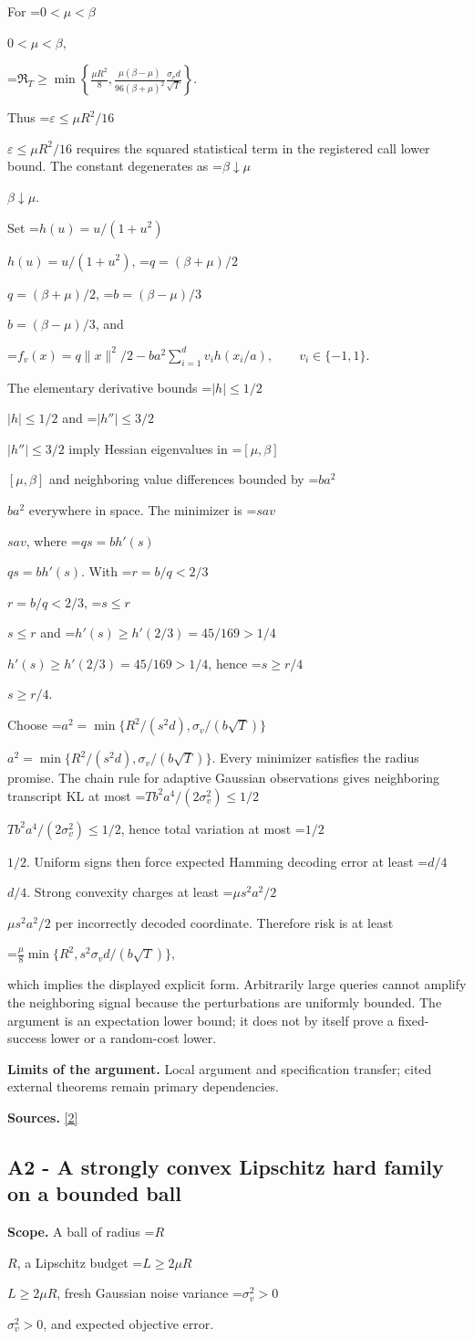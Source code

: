 \documentclass[10pt,a4paper]{article}
\newcommand{\AtlasMath}[1]{\par\begingroup\centering\setbox0=\hbox{$\displaystyle #1$}\ifdim\wd0>1.4\linewidth\typeout{ATLAS WIDE FORMULA: \the\wd0}\fi\ifdim\wd0>\linewidth\resizebox{\linewidth}{!}{\box0}\else\box0\fi\par\endgroup}
\newcommand{\AtlasInlineMath}[1]{\begingroup\setbox0=\hbox{$#1$}\ifdim\wd0>.4\linewidth\endgroup\AtlasMath{#1}\else\endgroup$#1$\fi}
\begin{document}
For \AtlasInlineMath{0<\mu<\beta},

\AtlasMath{\mathfrak R_T\ge\min\left\{\frac{\mu R^2}{8},\frac{\mu(\beta-\mu)}{96(\beta+\mu)^2}\frac{\sigma_v d}{\sqrt T}\right\}.}

Thus \AtlasInlineMath{\varepsilon\le\mu R^2/16} requires the squared statistical term in the registered call lower bound. The constant degenerates as \AtlasInlineMath{\beta\downarrow\mu}.

Set \AtlasInlineMath{h(u)=u/(1+u^2)}, \AtlasInlineMath{q=(\beta+\mu)/2}, \AtlasInlineMath{b=(\beta-\mu)/3}, and

\AtlasMath{f_v(x)=q\|x\|^2/2-ba^2\sum_{i=1}^d v_i h(x_i/a),\qquad v_i\in\{-1,1\}.}

The elementary derivative bounds \AtlasInlineMath{|h|\le1/2} and \AtlasInlineMath{|h''|\le3/2} imply Hessian eigenvalues in \AtlasInlineMath{[\mu,\beta]} and neighboring value differences bounded by \AtlasInlineMath{ba^2} everywhere in space. The minimizer is \AtlasInlineMath{sav}, where \AtlasInlineMath{qs=bh'(s)}. With \AtlasInlineMath{r=b/q<2/3}, \AtlasInlineMath{s\le r} and \AtlasInlineMath{h'(s)\ge h'(2/3)=45/169>1/4}, hence \AtlasInlineMath{s\ge r/4}.

Choose \AtlasInlineMath{a^2=\min\{R^2/(s^2d),\sigma_v/(b\sqrt T)\}}. Every minimizer satisfies the radius promise. The chain rule for adaptive Gaussian observations gives neighboring transcript KL at most \AtlasInlineMath{Tb^2a^4/(2\sigma_v^2)\le1/2}, hence total variation at most \AtlasInlineMath{1/2}. Uniform signs then force expected Hamming decoding error at least \AtlasInlineMath{d/4}. Strong convexity charges at least \AtlasInlineMath{\mu s^2a^2/2} per incorrectly decoded coordinate. Therefore risk is at least

\AtlasMath{\frac\mu8\min\{R^2,s^2\sigma_vd/(b\sqrt T)\},}

which implies the displayed explicit form. Arbitrarily large queries cannot amplify the neighboring signal because the perturbations are uniformly bounded. The argument is an expectation lower bound; it does not by itself prove a fixed-success lower or a random-cost lower.

\textbf{Limits of the argument.} Local argument and specification transfer; cited external theorems remain primary dependencies.

\textbf{Sources.} \href{https://proceedings.mlr.press/v30/Shamir13.html}{[2]}

\subsection{A2 - A strongly convex Lipschitz hard family on a bounded ball}
\textbf{Scope.} A ball of radius \AtlasInlineMath{R}, a Lipschitz budget \AtlasInlineMath{L\ge2\mu R}, fresh Gaussian noise variance \AtlasInlineMath{\sigma_v^2>0}, and expected objective error.
\end{document}
